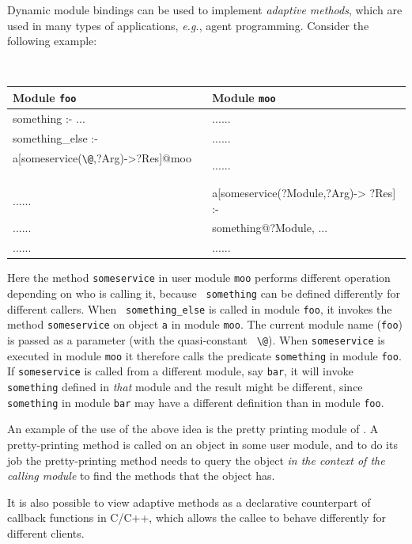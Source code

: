 \documentclass[11pt]{article}
\makeatletter
\newcommand{\ERGO}{\mbox{\smaller{\ensuremath{\cal{E}}\smaller{{\sc{RGO}}}}}\xspace}
\newcommand{\FLSYSTEM}{\ERGO}
\newcommand{\thismodule}{{\tt \bs{}@}\xspace}
\newcommand{\bs}{\textbackslash}
\makeatother
\begin{document}
Dynamic module bindings can be used to implement \emph{adaptive methods},
which are used in  many types of applications, {\it e.g.}, agent
programming. Consider the following example:
  \begin{center}
    {\tt
    \begin{tabular}{l l}
      Module {\tt foo}  & Module {\tt moo} \\
      \hline
      something :- ... & ......\\
      something\_else :- & ......\\
      \hspace*{1.5cm}a[someservice(\thismodule,?Arg)->?Res]@moo ~~& ......\\
      ...... & a[someservice(?Module,?Arg)-> ?Res] :- \\
      ...... & \hspace*{2.2cm} something@?Module, ...\\
      ...... & ......
      
    \end{tabular}
    }
  \end{center}
  
  Here the method {\tt someservice} in user module {\tt moo} performs
  different operation depending on who is calling it, because {\tt
    something} can be defined differently for different callers.  When {\tt
    something\_else} is called in module {\tt foo}, it invokes the method
  {\tt someservice} on object {\tt a} in module {\tt moo}. The current
  module name ({\tt foo}) is passed as a parameter (with the quasi-constant {\tt
  \bs{}@}). When {\tt someservice}
  is executed in module {\tt moo} it therefore calls the predicate {\tt something} in
  module {\tt foo}.
  If {\tt someservice} is called from a different module, say {\tt bar},  it will invoke
  {\tt something} defined in \emph{that} module and the result might be
  different, since {\tt something} in module {\tt bar} may have a different
  definition than in module {\tt foo}.      
  
  An example of the use of the above idea is the pretty printing module of
  \FLSYSTEM.
  A pretty-printing method is called on an object in some
  user module, and to do its job the pretty-printing method needs to query
  the object \emph{in the context of the calling module} to find the
  methods that the object has.

It is also possible to view adaptive methods as a declarative counterpart
of callback functions in C/C++, which allows the callee to behave
differently for different clients.
\end{document}
